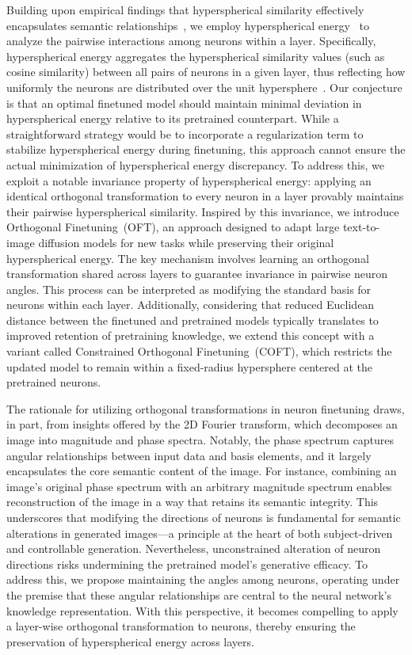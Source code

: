 Building upon empirical findings that hyperspherical similarity effectively encapsulates semantic relationships~\cite{liu2017deep,liu2018decoupled,chen2020angular}, we employ hyperspherical energy~\cite{liu2018learning} to analyze the pairwise interactions among neurons within a layer. Specifically, hyperspherical energy aggregates the hyperspherical similarity values (such as cosine similarity) between all pairs of neurons in a given layer, thus reflecting how uniformly the neurons are distributed over the unit hypersphere~\cite{liu2021learning}. Our conjecture is that an optimal finetuned model should maintain minimal deviation in hyperspherical energy relative to its pretrained counterpart. While a straightforward strategy would be to incorporate a regularization term to stabilize hyperspherical energy during finetuning, this approach cannot ensure the actual minimization of hyperspherical energy discrepancy. To address this, we exploit a notable invariance property of hyperspherical energy: applying an identical orthogonal transformation to every neuron in a layer provably maintains their pairwise hyperspherical similarity. Inspired by this invariance, we introduce Orthogonal Finetuning~(OFT), an approach designed to adapt large text-to-image diffusion models for new tasks while preserving their original hyperspherical energy. The key mechanism involves learning an orthogonal transformation shared across layers to guarantee invariance in pairwise neuron angles. This process can be interpreted as modifying the standard basis for neurons within each layer. Additionally, considering that reduced Euclidean distance between the finetuned and pretrained models typically translates to improved retention of pretraining knowledge, we extend this concept with a variant called Constrained Orthogonal Finetuning~(COFT), which restricts the updated model to remain within a fixed-radius hypersphere centered at the pretrained neurons.

The rationale for utilizing orthogonal transformations in neuron finetuning draws, in part, from insights offered by the 2D Fourier transform, which decomposes an image into magnitude and phase spectra. Notably, the phase spectrum captures angular relationships between input data and basis elements, and it largely encapsulates the core semantic content of the image. For instance, combining an image’s original phase spectrum with an arbitrary magnitude spectrum enables reconstruction of the image in a way that retains its semantic integrity. This underscores that modifying the directions of neurons is fundamental for semantic alterations in generated images—a principle at the heart of both subject-driven and controllable generation. Nevertheless, unconstrained alteration of neuron directions risks undermining the pretrained model’s generative efficacy. To address this, we propose maintaining the angles among neurons, operating under the premise that these angular relationships are central to the neural network’s knowledge representation. With this perspective, it becomes compelling to apply a layer-wise orthogonal transformation to neurons, thereby ensuring the preservation of hyperspherical energy across layers.

